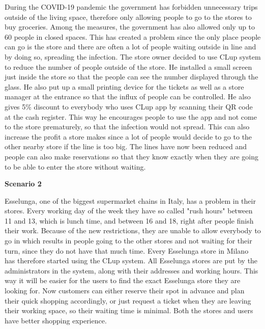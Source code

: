 \hspace{\parindent}During the COVID-19 pandemic the government has forbidden unnecessary trips outside of the living space, therefore only allowing people to go to the stores to buy groceries. Among the measures, the government has also allowed only up to 60 people in closed spaces. This has created a problem since the only place people can go is the store and there are often a lot of people waiting outside in line and by doing so, spreading the infection. The store owner decided to use CLup system to reduce the number of people outside of the store. He installed a small screen just inside the store so that the people can see the number displayed through the glass. He also put up a small printing device for the tickets as well as a store manager at the entrance so that the influx of people can be controlled. He also gives 5\% discount to everybody who uses CLup app by scanning their QR code at the cash register. This way he encourages people to use the app and not come to the store prematurely, so that the infection would not spread. This can also increase the profit a store makes since a lot of people would decide to go to the other nearby store if the line is too big. The lines have now been reduced and people can also make reservations so that they know exactly when they are going to be able to enter the store without waiting. \break

\textbf{Scenario 2}

\hspace{\parindent}Esselunga, one of the biggest supermarket chains in Italy, has a problem in their stores. Every working day of the week they have so called "rush hours" between 11 and 13, which is lunch time, and between 16 and 18, right after people finish their work. 
Because of the new restrictions, they are unable to allow everybody to go in which results in people going to the other stores and not waiting for their turn, since they do not have that much time. Every Esselunga store in Milano has therefore started using the CLup system. All Esselunga stores are put by the administrators in the system, along with their addresses and working hours. This way it will be easier for the users to find the exact Esselunga store they are looking for.  
Now customers can either reserve their spot in advance and plan their quick shopping accordingly, or just request a ticket when they are leaving their working space, so their waiting time is minimal. Both the stores and users have better shopping experience. \break


